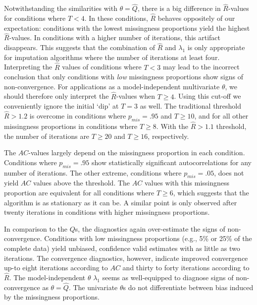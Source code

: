 \documentclass[Royal,times,sageh]{sagej}
\begin{document}
Notwithstanding the similarities with \(\theta=\hat{Q}\), there is a big difference in \(\widehat{R}\)-values for conditions where \(T<4\). In these conditions, \(\widehat{R}\) behaves oppositely of our expectation: conditions with the lowest missingness proportions yield the highest \(\widehat{R}\)-values. In conditions with a higher number of iterations, this artifact disappears. This suggests that the combination of \(\widehat{R}\) and \(\lambda_1\) is only appropriate for imputation algorithms where the number of iterations at least four. Interpreting the \(\widehat{R}\) values of conditions where \(T<3\) may lead to the incorrect conclusion that only conditions with \emph{low} missingness proportions show signs of non-convergence. For applications as a model-independent multivariate \(\theta\), we should therefore only interpret the \(\widehat{R}\)-values when \(T\geq4\). Using this cut-off we conveniently ignore the initial `dip' at \(T=3\) as well. The traditional threshold \(\widehat{R} > 1.2\) is overcome in conditions where \(p_{mis} = .95\) and \(T\geq10\), and for all other missingness proportions in conditions where \(T\geq8\). With the \(\widehat{R} > 1.1\) threshold, the number of iterations are \(T\geq20\) and \(T\geq16\), respectively.

The \(AC\)-values largely depend on the missingness proportion in each condition. Conditions where \(p_{mis}=.95\) show statistically significant autocorrelations for any number of iterations. The other extreme, conditions where \(p_{mis}=.05\), does not yield \(AC\) values above the threshold. The \(AC\) values with this missingness proportion are equivalent for all conditions where \(T\geq6\), which suggests that the algorithm is as stationary as it can be. A similar point is only observed after twenty iterations in conditions with higher missingness proportions.

In comparison to the \(Q\)s, the diagnostics again over-estimate the signs of non-convergence. Conditions with low missingness proportions (e.g., 5\% or 25\% of the complete data) yield unbiased, confidence valid estimates with as little as two iterations. The convergence diagnostics, however, indicate improved convergence up-to eight iterations according to \(AC\) and thirty to forty iterations according to \(\widehat{R}\). The model-independent \(\theta\) \(\lambda_1\) seems as well-equipped to diagnose signs of non-convergence as \(\theta=\hat{Q}\). The univariate \(\theta\)s do not differentiate between bias induced by the missingness proportions.
\end{document}
